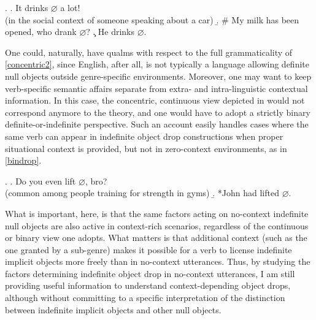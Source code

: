 \ex. \label{concentric} \a. \label{concentric1} It drinks $\varnothing$ a lot! \\ (in the social context of someone speaking about a car)
\b. \label{concentric2} \# My milk has been opened, who drank $\varnothing$?
\c. \label{concentric3} He drinks $\varnothing$.

One could, naturally, have qualms with respect to the full grammaticality of \ref{concentric2}, since English, after all, is not typically a language allowing definite null objects outside genre-specific environments. Moreover, one may want to keep verb-specific semantic affairs separate from extra- and intra-linguistic contextual information. In this case, the concentric, continuous view depicted in  would not correspond anymore to the theory, and one would have to adopt a strictly binary definite-or-indefinite perspective. Such an account easily handles cases where the same verb can appear in indefinite object drop constructions when proper situational context is provided, but not in zero-context environments, as in \ref{bindrop}.

\ex. \label{bindrop} \a. \label{bindrop1} Do you even lift $\varnothing$, bro? \hfill \parencite[9]{Glass2020} \\ (common among people training for strength in gyms)
\b. \label{bindrop2} *John had lifted $\varnothing$.

What is important, here, is that the same factors acting on no-context indefinite null objects are also active in context-rich scenarios, regardless of the continuous or binary view one adopts. What matters is that additional context (such as the one granted by a sub-genre) makes it possible for a verb to license indefinite implicit objects more freely than in no-context utterances. Thus, by studying the factors determining indefinite object drop in no-context utterances, I am still providing useful information to understand context-depending object drops, although without committing to a specific interpretation of the distinction between indefinite implicit objects and other null objects.
